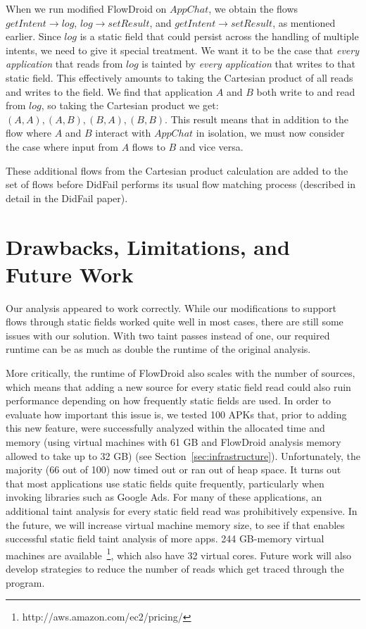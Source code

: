 When we run modified FlowDroid on $AppChat$, we obtain the flows $getIntent\rightarrow log$, $log\rightarrow setResult$, and $getIntent\rightarrow setResult$, as mentioned earlier. Since $log$ is a static field that could persist across the handling of multiple intents, we need to give it special treatment. We want it to be the case that \emph{every application} that reads from $log$ is tainted by \emph{every application} that writes to that static field. This effectively amounts to taking the Cartesian product of all reads and writes to the field. We find that application $A$ and $B$ both write to and read from $log$, so taking the Cartesian product we get: $(A, A), (A, B), (B, A), (B, B)$. This result means that in addition to the flow where $A$ and $B$ interact with $AppChat$ in isolation, we must now consider the case where input from $A$ flows to $B$ and vice versa.

These additional flows from the Cartesian product calculation are added to the set of flows before DidFail performs its usual flow matching process (described in detail in the DidFail paper).

\section{Drawbacks, Limitations, and Future Work}

Our analysis appeared to work correctly. While our modifications to support flows through static fields worked quite well in most cases, there are still some issues with our solution. With two taint passes instead of one, our required runtime can be as much as double the runtime of the original analysis. 

More critically, the runtime of FlowDroid also scales with the number of sources, which means that adding a new source for every static field read could also ruin performance depending on how frequently static fields are used. In order to evaluate how important this issue is, we tested 100 APKs that, prior to adding this new feature, were successfully analyzed within the allocated time and memory (using virtual machines with 61 GB and FlowDroid analysis memory allowed to take up to 32 GB) (see Section~\ref{sec:infrastructure}). Unfortunately, the majority (66 out of 100) now timed out or ran out of heap space. It turns out that most applications use static fields quite frequently, particularly when invoking libraries such as Google Ads. For many of these applications, an additional taint analysis for every static field read was prohibitively expensive. In the future, we will increase virtual machine memory size, to see if that enables successful static field taint analysis of more apps. 244 GB-memory virtual machines are available~\footnote{http://aws.amazon.com/ec2/pricing/}, which also have 32 virtual cores. Future work will also develop strategies to reduce the number of reads which get traced through the program. 


